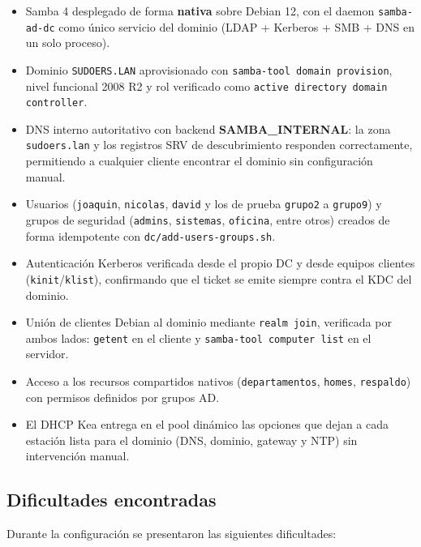 \begin{itemize}
  \item Samba 4 desplegado de forma \textbf{nativa} sobre Debian 12, con
        el daemon \texttt{samba-ad-dc} como único servicio del dominio
        (LDAP + Kerberos + SMB + DNS en un solo proceso).
  \item Dominio \texttt{SUDOERS.LAN} aprovisionado con
        \texttt{samba-tool domain provision}, nivel funcional 2008 R2 y rol
        verificado como \texttt{active directory domain controller}.
  \item DNS interno autoritativo con backend \textbf{SAMBA\_INTERNAL}: la
        zona \texttt{sudoers.lan} y los registros SRV de descubrimiento
        responden correctamente, permitiendo a cualquier cliente encontrar el
        dominio sin configuración manual.
  \item Usuarios (\texttt{joaquin}, \texttt{nicolas}, \texttt{david} y los
        de prueba \texttt{grupo2} a \texttt{grupo9}) y grupos de seguridad
        (\texttt{admins}, \texttt{sistemas}, \texttt{oficina}, entre otros)
        creados de forma idempotente con \texttt{dc/add-users-groups.sh}.
  \item Autenticación Kerberos verificada desde el propio DC y desde equipos
        clientes (\texttt{kinit}/\texttt{klist}), confirmando que el ticket
        se emite siempre contra el KDC del dominio.
  \item Unión de clientes Debian al dominio mediante \texttt{realm join},
        verificada por ambos lados: \texttt{getent} en el cliente y
        \texttt{samba-tool computer list} en el servidor.
  \item Acceso a los recursos compartidos nativos (\texttt{departamentos},
        \texttt{homes}, \texttt{respaldo}) con permisos definidos por grupos
        AD.
  \item El DHCP Kea entrega en el pool dinámico las opciones que dejan a cada
        estación lista para el dominio (DNS, dominio, gateway y NTP) sin
        intervención manual.
\end{itemize}

\subsection{Dificultades encontradas}

Durante la configuración se presentaron las siguientes dificultades:

